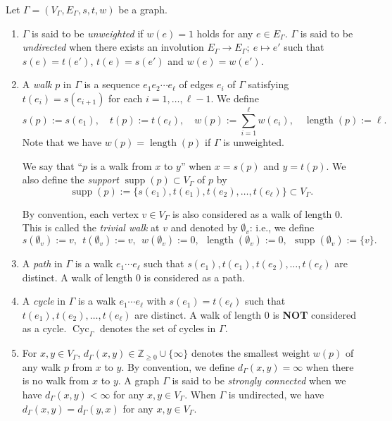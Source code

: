 \begin{defn}
Let $\Gamma = (V_{\Gamma}, E_{\Gamma}, s, t, w)$ be a graph. 

\begin{enumerate}
\item 
$\Gamma$ is said to be \textit{unweighted} if $w(e) = 1$ holds for any $e \in E_{\Gamma}$. 
$\Gamma$ is said to be \textit{undirected} when 
there exists an involution $E_{\Gamma} \to E_{\Gamma};\ e \mapsto e'$
such that $s(e)=t(e')$, $t(e)=s(e')$ and $w(e)=w(e')$. 

\item
A \textit{walk} $p$ in $\Gamma$ is a sequence $e_1 e_2 \cdots e_{\ell}$ of edges $e_i$ of $\Gamma$ satisfying 
$t(e_i) = s(e_{i+1})$ for each $i = 1, \ldots , \ell -1$. 
We define 
\[
s(p) := s(e_1), \quad
t(p) := t(e_{\ell}), \quad
w(p) := \sum _{i = 1} ^{\ell} w(e_i), \quad 
\operatorname{length}(p) := \ell. 
\]
Note that we have $w(p) = \operatorname{length}(p)$ if $\Gamma$ is unweighted. 


We say that ``$p$ is a walk from $x$ to $y$'' when $x = s(p)$ and $y = t(p)$. 
We also define the \textit{support} $\operatorname{supp}(p) \subset V_{\Gamma}$ of $p$ by
\[
\operatorname{supp}(p) := \{ s(e_1), t(e_1), t(e_2), \ldots , t(e_{\ell}) \} \subset V_{\Gamma}. 
\]

By convention, each vertex $v \in V_{\Gamma}$ is also considered as a walk of length $0$. 
This is called the \textit{trivial walk} at $v$ and denoted by $\emptyset _v$: i.e., 
we define 
\[
s(\emptyset _v) := v, \ \ 
t(\emptyset _v) := v, \ \ 
w(\emptyset _v) := 0, \ \  
\operatorname{length}(\emptyset _v) := 0, \ \ 
\operatorname{supp}(\emptyset _v) := \{ v \}.
\]

\item 
A \textit{path} in $\Gamma$ is a walk $e_1 \cdots e_{\ell}$ such that $s(e_1), t(e_1), t(e_2), \ldots, t(e_{\ell})$ are distinct. 
A walk of length $0$ is considered as a path. 

\item
A \textit{cycle} in $\Gamma$ is a walk $e_1 \cdots e_{\ell}$ with $s(e_1) = t(e_{\ell})$ 
such that $t(e_1), t(e_2), \ldots, t(e_{\ell})$ are distinct. 
A walk of length $0$ is \textbf{NOT} considered as a cycle. 
$\operatorname{Cyc}_{\Gamma}$ denotes the set of cycles in $\Gamma$. 

\item 
For $x, y \in V_{\Gamma}$, $d_{\Gamma}(x, y) \in \mathbb{Z}_{\ge 0} \cup \{ \infty \}$ denotes the smallest weight $w(p)$ of any walk $p$ from $x$ to $y$. 
By convention, we define $d_{\Gamma}(x, y) = \infty$ when there is no walk from $x$ to $y$. 
A graph $\Gamma$ is said to be \textit{strongly connected} 
when we have $d_{\Gamma}(x, y) < \infty$ for any $x, y \in V_{\Gamma}$. 
When $\Gamma$ is undirected, we have $d_{\Gamma}(x,y) = d_{\Gamma}(y,x)$ for any $x,y \in V_{\Gamma}$. 


\end{enumerate}
\end{defn}

